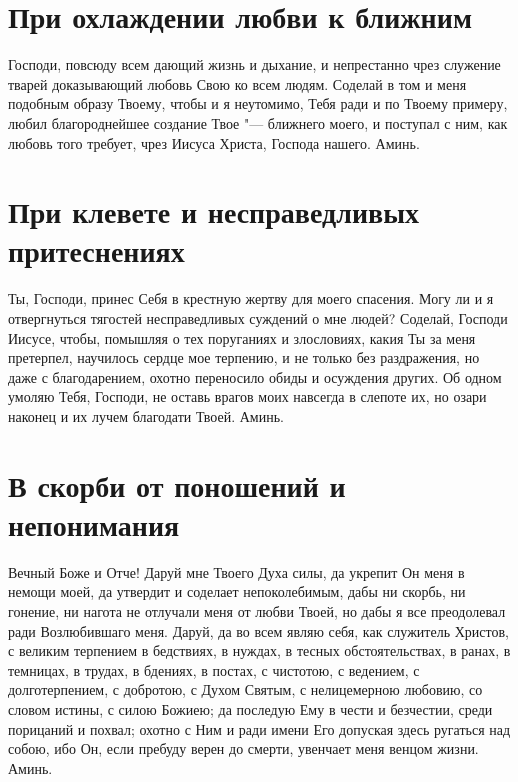 \section{При охлаждении любви к ближним}
 


Господи, повсюду всем дающий жизнь и дыхание, и непрестанно чрез служение тварей доказывающий любовь Свою ко всем людям. Соделай в том и меня подобным образу Твоему, чтобы и я неутомимо, Тебя ради и по Твоему примеру, любил благороднейшее создание Твое "--- ближнего моего, и поступал с ним, как любовь того требует, чрез Иисуса Христа, Господа нашего. Аминь.


\section{При клевете и несправедливых притеснениях}
 


Ты, Господи, принес Себя в крестную жертву для моего спасения. Могу ли и я отвергнуться тягостей несправедливых суждений о мне людей? Соделай, Господи Иисусе, чтобы, помышляя о тех поруганиях и злословиях, какия Ты за меня претерпел, научилось сердце мое терпению, и не только без раздражения, но даже с благодарением, охотно переносило обиды и осуждения других. Об одном умоляю Тебя, Господи, не оставь врагов моих навсегда в слепоте их, но озари наконец и их лучем благодати Твоей. Аминь.


\section{В скорби от поношений и непонимания}
 


Вечный Боже и Отче! Даруй мне Твоего Духа силы, да укрепит Он меня в немощи моей, да утвердит и соделает непоколебимым, дабы ни скорбь, ни гонение, ни нагота не отлучали меня от любви Твоей, но дабы я все преодолевал ради Возлюбившаго меня. Даруй, да во всем являю себя, как служитель Христов, с великим терпением в бедствиях, в нуждах, в тесных обстоятельствах, в ранах, в темницах, в трудах, в бдениях, в постах, с чистотою, с ведением, с долготерпением, с добротою, с Духом Святым, с нелицемерною любовию, со словом истины, с силою Божиею; да последую Ему в чести и безчестии, среди порицаний и похвал; охотно с Ним и ради имени Его допуская здесь ругаться над собою, ибо Он, если пребуду верен до смерти, увенчает меня венцом жизни. Аминь.



